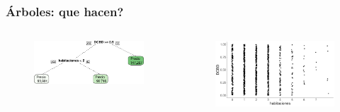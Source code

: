 \documentclass[
  shownotes,
  xcolor={svgnames},
  hyperref={colorlinks,citecolor=DarkBlue,linkcolor=DarkRed,urlcolor=DarkBlue}
  , aspectratio=169]{beamer}
\begin{document}
\begin{frame}[fragile]
\frametitle{Árboles: que hacen?}



\begin{columns}[T] %
\begin{column}{.42\textwidth}
  
\begin{figure}[H] \centering
            \captionsetup{justification=centering}
              \includegraphics[scale=0.4]{figures/trees.pdf}                           
 \end{figure}

\end{column}  
\hfill
\begin{column}{.48\textwidth}

 \begin{figure}[H] \centering
            \captionsetup{justification=centering}
              \includegraphics[scale=0.25]{figures/dcbd_hab.pdf}                           
 \end{figure}

\end{column}
\end{columns}


\end{frame}
\end{document}
